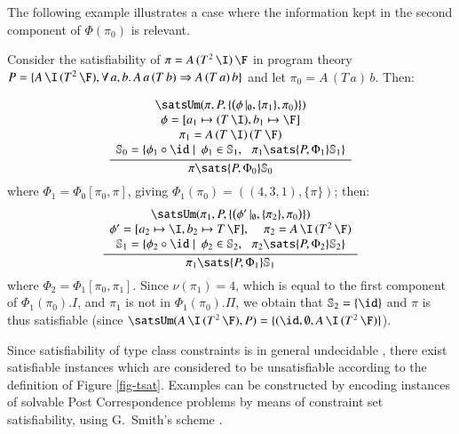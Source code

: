 \documentclass[review]{elsarticle}
\begin{document}
The following example illustrates a case where the information kept in
the second component of $\Phi(\pi_0)$ is relevant.

\begin{Example}
\label{Paterson-condition-failure-example}
{\rm Consider the satisfiability of $\pi = A\,(T^2\,\I)\,\F$ in
  program theory $P = \{ A\,\I\,(T^2\,\F), \forall\,a,b.\,A\,a\,(T\,b)
  \Rightarrow A\,(T\,a)\,b\}$ and let $\pi_0 = A\,(T\,a)\,b$. Then:}

\[
	\displaystyle\frac
		{\begin{array}{c}
            \satsUm(\pi,P,\{ \bigl( \phi\,|_\emptyset, \{ \pi_1 \}, \pi_0 \bigr) \}) \\
            \phi = [a_1\mapsto (T\,\I), b_1 \mapsto \F] \\ \pi_1 = A\,(T\:\I)\,(T\:\F)\\
            \mathbb{S}_0 = \{ \phi_1\circ \id \mid \: \phi_1 \in \mathbb{S}_1,\:\:\:
                                                \pi_1 \sats {P,\Phi_1} \mathbb{S}_1\}
         \end{array}}
		{\pi \sats {P,\Phi_0} \mathbb{S}_0}
\]
{\rm where $\Phi_1 = \Phi_0[\pi_0,\pi]$, giving $\Phi_1(\pi_0) = ((4,3,1), \{ \pi \})$; then:
\[
	\displaystyle\frac
		{\begin{array}{c}
            \satsUm(\pi_1,P,\{ \bigl( \phi'\,|_\emptyset, \{ \pi_2 \}, \pi_0 \bigr) \})\\
            \phi' = [a_2\mapsto \text{\tt \I}, b_2 \mapsto T\,\F],\,\,\,\,\,\,\, \pi_2 = A\,\I\, (T^2\,\F)\\
            \mathbb{S}_1 = \{ \phi_2\circ \id \mid \: \phi_2 \in \mathbb{S}_2,\:\:\:
            \pi_2 \sats {P,\Phi_2} \mathbb{S}_2\}
         \end{array}}
		{\pi_1 \sats {P,\Phi_1} \mathbb{S}_1}
\]
where $\Phi_2 = \Phi_1[\pi_0,\pi_1]$. Since
      $\nu(\pi_1) = 4$, which is equal to the first component of $\Phi_1(\pi_0).I$,
      and
      $\pi_1$ is not in $\Phi_1(\pi_0).\Pi$, we obtain that
 $\mathbb{S}_2 = \{ \id \}$ and $\pi$ is thus satisfiable
 (since $\satsUm(A\,\I\,(T^2\,\F),P) =
   \{ (\id, \emptyset, A\,\I\,(T^2\,\F)\}$). }
\end{Example}

Since satisfiability of type class constraints is in general
undecidable \cite{Smith-PhD-Thesis91}, there exist satisfiable
instances which are considered to be unsatisfiable according to the
definition of Figure \ref{fig-tsat}. Examples can be constructed by
encoding instances of solvable Post Correspondence problems by means
of constraint set satisfiability, using G.~Smith's scheme
\cite{Smith-PhD-Thesis91}.
\end{document}

